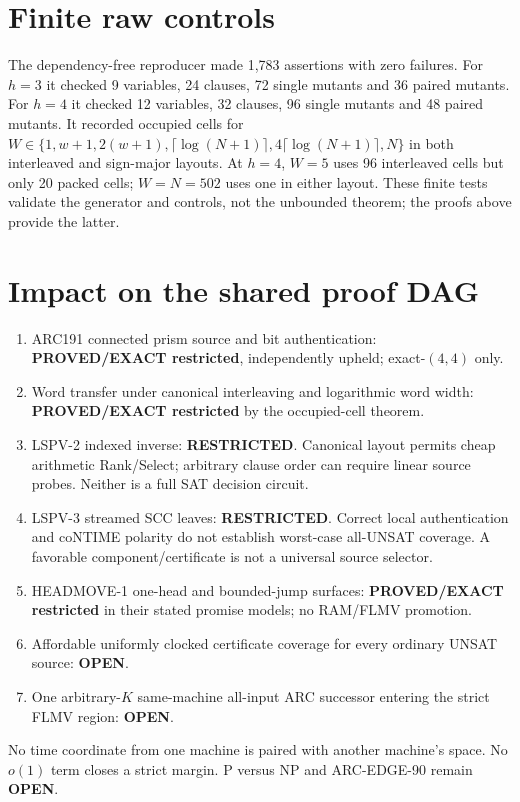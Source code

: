 \documentclass[11pt]{article}
\begin{document}
\section{Finite raw controls}
The dependency-free reproducer made 1,783 assertions with zero failures.
For $h=3$ it checked 9 variables, 24 clauses, 72 single mutants and 36 paired
mutants.  For $h=4$ it checked 12 variables, 32 clauses, 96 single mutants
and 48 paired mutants.  It recorded occupied cells for $W\in\{1,w+1,
2(w+1),\lceil\log(N+1)\rceil,4\lceil\log(N+1)\rceil,N\}$ in both
interleaved and sign-major layouts.  At $h=4$, $W=5$ uses 96 interleaved
cells but only 20 packed cells; $W=N=502$ uses one in either layout.  These
finite tests validate the generator and controls, not the unbounded theorem;
the proofs above provide the latter.

\section{Impact on the shared proof DAG}
\begin{enumerate}
\item ARC191 connected prism source and bit authentication:
\textbf{PROVED/EXACT restricted}, independently upheld; exact-$(4,4)$ only.
\item Word transfer under canonical interleaving and logarithmic word width:
\textbf{PROVED/EXACT restricted} by the occupied-cell theorem.
\item LSPV-2 indexed inverse: \textbf{RESTRICTED}.  Canonical layout permits
cheap arithmetic Rank/Select; arbitrary clause order can require linear
source probes.  Neither is a full SAT decision circuit.
\item LSPV-3 streamed SCC leaves: \textbf{RESTRICTED}.  Correct local
authentication and coNTIME polarity do not establish worst-case all-UNSAT
coverage.  A favorable component/certificate is not a universal source
selector.
\item HEADMOVE-1 one-head and bounded-jump surfaces: \textbf{PROVED/EXACT
restricted} in their stated promise models; no RAM/FLMV promotion.
\item Affordable uniformly clocked certificate coverage for every ordinary
UNSAT source: \textbf{OPEN}.
\item One arbitrary-$K$ same-machine all-input ARC successor entering the
strict FLMV region: \textbf{OPEN}.
\end{enumerate}
No time coordinate from one machine is paired with another machine's space.
No $o(1)$ term closes a strict margin.  P versus NP and ARC-EDGE-90 remain
\textbf{OPEN}.
\end{document}
